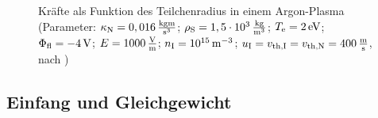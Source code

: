\begin{figure}[!t]
\begin{subfigure}[t]{0.49\textwidth}
        \caption{}
        \label{img:rechtseq}
      \end{subfigure}
      \caption{Kräfte als Funktion des Teilchenradius in einem Argon-Plasma (Parameter: $\kappa\ix{N}=\unit[0,016]{\frac{kg m}{s^3}}$;  \mbox{$\rho\ix{S}=\unit[1,5\cdot\tenpo{3}]{\frac{kg}{m^3}}$}; $T\ix{e}=\unit[2]{eV}$; $\Phi\ix{fl}=\unit[-4]{V}$; $E=\unit[1000]{\frac{V}{m}}$; $n\ix{I}=\unit[\tenpo{15}]{m^{-3}}$; $u\ix{I}=v\ix{th,I}=v\ix{th,N}=\unit[400]{\frac{m}{s}}$, nach \cite{Melzer12}) }
      \label{img:kräfte}
    \end{figure}

  \subsection{Einfang und Gleichgewicht}\label{subub:einfang}

